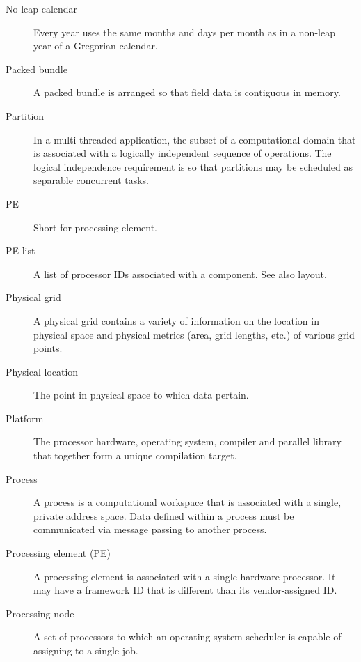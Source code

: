 \begin{description}
\item [No-leap calendar] \label{glos:NoLeap} Every year uses the same months 
and days per month as in a non-leap year of a Gregorian calendar.

\item[Packed bundle] \label{glos:PackedBundle} A packed bundle is arranged
  so that field data is contiguous in memory.

\item[Partition] \label{glos:Partition} In a multi-threaded application, the subset of a
  computational domain that is associated with a logically independent
  sequence of operations. The logical independence requirement is so
  that partitions may be scheduled as separable concurrent tasks.

\item[PE] \label{glos:PE} Short for processing element.

\item[PE list] \label{glos:PElist} A list of processor IDs associated 
  with a component.  See also layout.

\item[Physical grid] \label{term:PhysGrid} 
  A physical grid contains a variety of information
  on the location in physical space and physical metrics (area,
  grid lengths, etc.) of various grid points.

\item[Physical location] \label{glos:PhysLoc} The point in physical space 
  to which data pertain. 

\item[Platform] \label{glos:Platform} 
  The processor hardware, operating system, compiler and
  parallel library that together form a unique compilation target.

\item[Process] \label{glos:Process}
  A process is a computational workspace that is associated with a single,
  private address space.  Data defined within a process must be communicated
  via message passing to another process.

\item[Processing element (PE)] \label{glos:Processing_Element}
A processing element is associated with a single hardware processor.  It may
have a framework ID that is different than its vendor-assigned ID.  

\item[Processing node] \label{glos:Pnode} A set of processors to which an
  operating system scheduler is capable of assigning to a single job.


\end{description}

